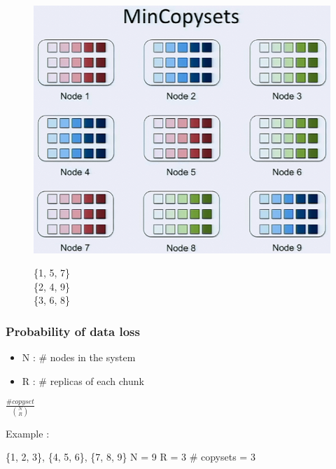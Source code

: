 \documentclass[xcolor=table]{beamer}
\begin{document}
	\begin{frame}
		\begin{figure}[htb]
			\begin{minipage}[b]{0.69\linewidth}
				\centering
				\graphicspath{{fig/}}
				\includegraphics[width=1\textwidth]{4.png}
			\end{minipage}
			\begin{minipage}[b]{0.29\linewidth}
				\begin{center}
					\alert{	\{1, 5, 7\}\\
							\{2, 4, 9\}\\
							\{3, 6, 8\} }
				\end{center}
			\end{minipage}
		\end{figure}
	\end{frame}

	\begin{frame}
		\frametitle{Probability of data loss}
		\begin{minipage}[h]{0.49\linewidth}
			\centering
			\small
			\begin{itemize}
				\item N : \# nodes in the system
				\item R : \# replicas of each chunk
			\end{itemize}
		\end{minipage}
		\begin{minipage}[h]{0.49\linewidth}
			\centering
			\Huge
			$\frac{\# copyset}{\binom{N}{R}}$
		\end{minipage}
		\newline
		\newline
		Example :
		\begin{center}
			\alert{\{1, 2, 3\}, \{4, 5, 6\}, \{7, 8, 9\}}
			\newline
			\newline
			N = 9\newline
			R = 3
			\newline
			\newline
			\# copysets = 3
			\newline
		\end{center}
	\end{frame}
\end{document}
